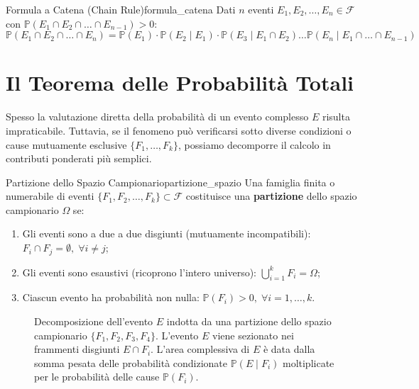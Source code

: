 \begin{teorema}{Formula a Catena (Chain Rule)}{formula_catena}
Dati $n$ eventi $E_1, E_2, \dots, E_n \in \mathcal{F}$ con $\mathbb{P}(E_1 \cap E_2 \cap \dots \cap E_{n-1}) > 0$:
\begin{equation}
    \mathbb{P}(E_1 \cap E_2 \cap \dots \cap E_n) = \mathbb{P}(E_1) \cdot \mathbb{P}(E_2 \mid E_1) \cdot \mathbb{P}(E_3 \mid E_1 \cap E_2) \dots \mathbb{P}(E_n \mid E_1 \cap \dots \cap E_{n-1})
\end{equation}
\end{teorema}

\section{Il Teorema delle Probabilità Totali}
\label{sec:probabilita_totali}

Spesso la valutazione diretta della probabilità di un evento complesso $E$ risulta impraticabile. Tuttavia, se il fenomeno può verificarsi sotto diverse condizioni o cause mutuamente esclusive $\{F_1, \dots, F_k\}$, possiamo decomporre il calcolo in contributi ponderati più semplici.

\begin{definizione}{Partizione dello Spazio Campionario}{partizione_spazio}
Una famiglia finita o numerabile di eventi $\{F_1, F_2, \dots, F_k\} \subset \mathcal{F}$ costituisce una \textbf{partizione} dello spazio campionario $\Omega$ se:
\begin{enumerate}
    \item Gli eventi sono a due a due disgiunti (mutuamente incompatibili): $F_i \cap F_j = \emptyset, \; \forall i \neq j$;
    \item Gli eventi sono esaustivi (ricoprono l'intero universo): $\bigcup_{i=1}^k F_i = \Omega$;
    \item Ciascun evento ha probabilità non nulla: $\mathbb{P}(F_i) > 0, \; \forall i=1,\dots,k$.
\end{enumerate}
\end{definizione}

\begin{figure}[htbp]
\centering

\caption{Decomposizione dell'evento $E$ indotta da una partizione dello spazio campionario $\{F_1, F_2, F_3, F_4\}$. L'evento $E$ viene sezionato nei frammenti disgiunti $E \cap F_i$. L'area complessiva di $E$ è data dalla somma pesata delle probabilità condizionate $\mathbb{P}(E \mid F_i)$ moltiplicate per le probabilità delle cause $\mathbb{P}(F_i)$.}
\label{fig:partizione_probabilita_totali}
\end{figure}

